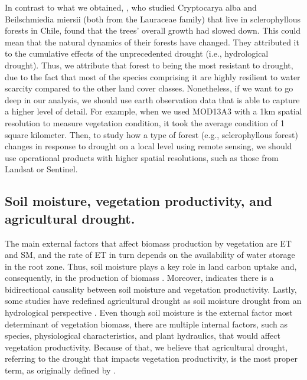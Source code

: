 \documentclass[
  authoryear,
  preprint,
  3p,
  onecolumn]{elsarticle}
\begin{document}
In contrast to what we obtained, \citet{Venegas2022}, who studied
Cryptocarya alba and Beilschmiedia miersii (both from the Lauraceae
family) that live in sclerophyllous forests in Chile, found that the
trees' overall growth had slowed down. This could mean that the natural
dynamics of their forests have changed. They attributed it to the
cumulative effects of the unprecedented drought (i.e., hydrological
drought). Thus, we attribute that forest to being the most resistant to
drought, due to the fact that most of the species comprising it are
highly resilient to water scarcity compared to the other land cover
classes. Nonetheless, if we want to go deep in our analysis, we should
use earth observation data that is able to capture a higher level of
detail. For example, when we used MOD13A3 with a 1km spatial resolution
to measure vegetation condition, it took the average condition of 1
square kilometer. Then, to study how a type of forest (e.g.,
sclerophyllous forest) changes in response to drought on a local level
using remote sensing, we should use operational products with higher
spatial resolutions, such as those from Landsat or Sentinel.

\hypertarget{soil-moisture-vegetation-productivity-and-agricultural-drought.}{%
\subsection{Soil moisture, vegetation productivity, and agricultural
drought.}\label{soil-moisture-vegetation-productivity-and-agricultural-drought.}}

The main external factors that affect biomass production by vegetation
are ET and SM, and the rate of ET in turn depends on the availability of
water storage in the root zone. Thus, soil moisture plays a key role in
land carbon uptake and, consequently, in the production of biomass
\citep{Humphrey2021}. Moreover, \citet{Zhang2022} indicates there is a
bidirectional causality between soil moisture and vegetation
productivity. Lastly, some studies have redefined agricultural drought
as soil moisture drought from an hydrological perspective
\citep{Loon2016, Samaniego2018}. Even though soil moisture is the
external factor most determinant of vegetation biomass, there are
multiple internal factors, such as species, physiological
characteristics, and plant hydraulics, that would affect vegetation
productivity. Because of that, we believe that agricultural drought,
referring to the drought that impacts vegetation productivity, is the
most proper term, as originally defined by \citet{Wilhite1985}.
\end{document}
